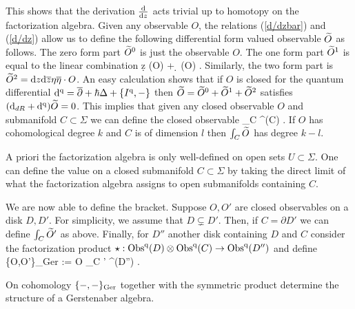 This shows that the derivation $\frac{\d}{\d z}$ acts trivial up to homotopy on the factorization algebra.
Given any observable $O$, the relations (\ref{d/dzbar}) and (\ref{d/dz}) allow us to define the following differential form valued observable $\Tilde{O}$ as follows. 
The zero form part $\Tilde{O}^{0}$ is just the observable $O$. 
The one form part $\Tilde{O}^1$ is equal to the linear combination
\ben
\d z \; (\eta \cdot O) + \d \zbar \; (\Bar{\eta}\cdot O) . 
\een
Similarly, the two form part is $\Tilde{O}^2 = \d z \d \zbar \eta \Bar{\eta} \cdot O$. 
An easy calculation shows that if $O$ is closed for the quantum differential $\d^\q = \dbar + \hbar \Delta + \{I^\q, -\}$ then $\Tilde{O} = \Tilde{O}^{0} + \Tilde{O}^1 + \Tilde{O}^2$ satisfies $(\d_{dR} + \d^\q) \Tilde{O} = 0$. 
This implies that given any closed observable $O$ and submanifold $C \subset \Sigma$ we can define the closed observable
\ben
\int_C  \in \Obs^\q(C) .
\een
If $O$ has cohomological degree $k$ and $C$ is of dimension $l$ then $\int_C \Tilde{O}$ has degree $k - l$. 

\begin{rmk}
A priori the factorization algebra is only well-defined on open sets $U \subset \Sigma$. 
One can define the value on a closed submanifold $C \subset \Sigma$ by taking the direct limit of what the factorization algebra assigns to open submanifolds containing $C$. 
\end{rmk} 

We are now able to define the bracket. 
Suppose $O,O'$ are closed observables on a disk $D,D'$.
For simplicity, we assume that $D \subsetneq D'$. 
Then, if $C = \partial D'$ we can define $\int_C \Tilde{O}'$ as above. 
Finally, for $D''$ another disk containing $D$ and $C$ consider the factorization product $\star : \Obs^\q(D) \tensor \Obs^\q (C) \to \Obs^\q(D'')$ and define
\ben
\{O,O'\}_{\rm Ger} := O \star \int_C ' \in \Obs^\q (D'') .
\een 

\begin{prop} On cohomology $\{-,-\}_{\rm Ger}$ together with the symmetric product determine the structure of a Gerstenaber algebra. 
\end{prop}

